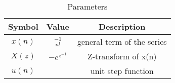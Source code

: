 \begin{table}[h]
  \centering
  \begin{tabular}{|c|c|c|}
    \hline
    	\textbf{Symbol} & \textbf{Value} & \textbf{Description} \\
    \hline
	  $x(n)$ & $\frac{-1}{n!}$ & general term of the series \\
    \hline
	  $X(z)$ & $- e^{z^{-1}}$ &Z-transform of x(n) \\
    \hline 
	  $u(n)$ & &unit step function \\
    \hline
  \end{tabular}
  \vspace{0.3cm}
  \caption{Parameters}
  \label{tab:parameters}
\end{table}
